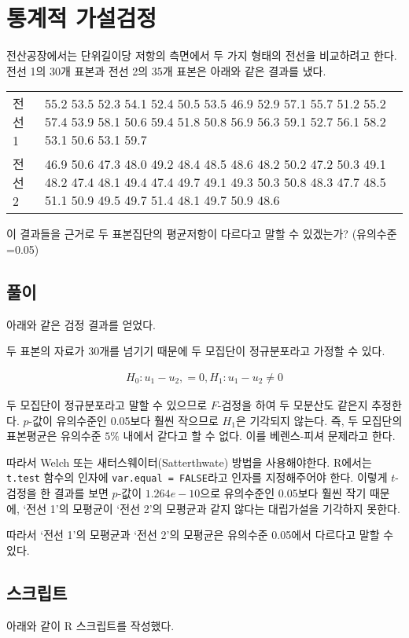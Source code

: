 \section{통계적 가설검정}
전산공장에서는 단위길이당 저항의 측면에서 두 가지 형태의 전선을 비교하려고
한다. 전선 1의 30개 표본과 전선 2의 35개 표본은 아래와 같은 결과를 냈다.

\begin{tabularx}{0.9\textwidth}{ l|X }
  \noalign{\smallskip}\hline\noalign{\smallskip}
  전선 1 & 
    55.2 53.5 52.3 54.1 52.4 50.5 53.5 46.9 52.9 57.1
    55.7 51.2 55.2 57.4 53.9 58.1 50.6 59.4 51.8 50.8
    56.9 56.3 59.1 52.7 56.1 58.2 53.1 50.6 53.1 59.7 \\
  전선 2 &
    46.9 50.6 47.3 48.0 49.2 48.4 48.5 48.6 48.2 50.2
    47.2 50.3 49.1 48.2 47.4 48.1 49.4 47.4 49.7 49.1
    49.3 50.3 50.8 48.3 47.7 48.5 51.1 50.9 49.5 49.7
    51.4 48.1 49.7 50.9 48.6
\end{tabularx}

이 결과들을 근거로 두 표본집단의 평균저항이 다르다고 말할 수 있겠는가?
{\small(유의수준=0.05)}

\subsection{풀이}

아래와 같은 검정 결과를 얻었다.


두 표본의 자료가 30개를 넘기기 때문에 두 모집단이 정규분포라고 가정할 수 있다.

\begin{align*}
  H_0: u_1 - u_2, = 0, H_1: u_1 - u_2 \not= 0
\end{align*}

두 모집단이 정규분포라고 말할 수 있으므로 $F$-검정을 하여 두 모분산도 같은지 추정한다.
$p$-값이 유의수준인 0.05보다 훨씬 작으므로 $H_1$은 기각되지 않는다.
즉, 두 모집단의 표본평균은 유의수준 $5\%$ 내에서 같다고 할 수 없다.
이를 베렌스-피셔 문제라고 한다.

따라서 Welch 또는 새터스웨이터(Satterthwate) 방법을 사용해야한다.
R에서는 \texttt{t.test} 함수의 인자에 \texttt{var.equal = FALSE}라고 인자를 지정해주어야 한다.
이렇게 $t$-검정을 한 결과를 보면 $p$-값이 $1.264e-10$으로 유의수준인 0.05보다 훨씬 작기 때문에,
`전선 1'의 모평균이 `전선 2'의 모평균과 같지 않다는 대립가설을 기각하지 못한다.

따라서 `전선 1'의 모평균과 `전선 2'의 모평균은 유의수준 0.05에서 다르다고 말할 수 있다.

\subsection{스크립트}
아래와 같이 R 스크립트를 작성했다.

